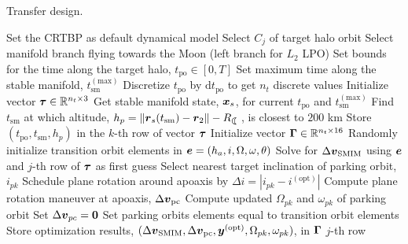 \begin{algorithm}[!b]
	\caption{Transfer design.}\label{alg:TransferDeign}
	\begin{algorithmic}[]
		\State Set the CRTBP as default dynamical model
		\State Select $C_j$ of target halo orbit 
		\State Select manifold branch flying towards the Moon (\ie left branch for $L_2$ LPO)
		\EndProcedure
		\State Set bounds for the time along the target halo, $t_{\textrm{po}}\in\left[0,T\right]$ 
		\State Set maximum time along the stable manifold, $t^{(\textrm{max})}_{\textrm{sm}}$
		\State Discretize $t_{\textrm{po}}$ by $\textrm{d}t_{\textrm{po}}$ to get $n_t$ discrete values
		\State Initialize vector $\boldsymbol{\tau}\in\mathbb{R}^{n_t\times3}$
		\State Get stable manifold state, $\boldsymbol{x}_s$, for current $t_{\textrm{po}}$ and $t^{(\textrm{max})}_{\textrm{sm}}$ 
		\State Find $t_{\textrm{sm}}$ at which altitude, $h_p = \|\vect{r}_s(t_{\textrm{sm}})-\vect{r}_2\|-R_{\leftmoon}$, is closest to $200$ km
		\State Store $(t_{\textrm{po}},t_{\textrm{sm}},h_p)$ in the $k$-th row of vector $\boldsymbol{\tau}$
		\EndFor
		\EndProcedure
		\State Initialize vector $\boldsymbol{\Gamma}\in\mathbb{R}^{n_t\times16}$
		\Repeat
		\State Randomly initialize transition orbit elements in $\boldsymbol{e} = (h_a,i,\Omega,\omega,\theta)$
		\State Solve for $\Delta\boldsymbol{v}_{\textrm{SMIM}}$ using $\boldsymbol{e}$ and $j$-th row of $\boldsymbol{\tau}$ as first guess 
		\State Select nearest target inclination of parking orbit, $i_{pk}$ 
		\State Schedule plane rotation around apoaxis by $\Delta i = |i_{pk}-i^{(\textrm{opt})}|$
		\State Compute plane rotation maneuver at apoaxis, $\Delta\boldsymbol{v}_{\textrm{pc}}$
		\State Compute updated $\Omega_{pk}$ and $\omega_{pk}$ of parking orbit
		\Else
		\State Set $\Delta\boldsymbol{v}_{pc} = \boldsymbol{0}$
		\State Set parking orbits elements equal to transition orbit elements
		\EndIf
		\State Store optimization results, $(\Delta\boldsymbol{v}_{\textrm{SMIM}},\Delta\boldsymbol{v}_{\textrm{pc}},\boldsymbol{y}^{(\textrm{opt})},\Omega_{pk},\omega_{pk})$, in $\boldsymbol{\Gamma}$ $j$-th row
		\EndLoop
		\EndProcedure
	\end{algorithmic}
\end{algorithm}
% 

